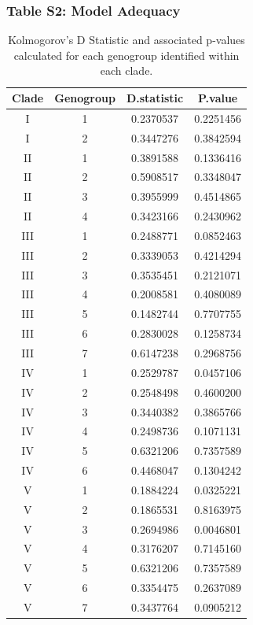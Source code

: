 \documentclass[
  11pt,
]{article}
\begin{document}
\hypertarget{table-s2-model-adequacy}{%
\subsubsection{Table S2: Model Adequacy}\label{table-s2-model-adequacy}}

\begin{table}[H]

\caption{\label{tab:ModelAdequacyTable}Kolmogorov's D Statistic and associated p-values calculated for each genogroup identified within each clade.}
\centering
\begin{tabular}[t]{cccc}
\toprule
Clade & Genogroup & D.statistic & P.value\\
\midrule
I & 1 & 0.2370537 & 0.2251456\\
I & 2 & 0.3447276 & 0.3842594\\
II & 1 & 0.3891588 & 0.1336416\\
II & 2 & 0.5908517 & 0.3348047\\
II & 3 & 0.3955999 & 0.4514865\\
II & 4 & 0.3423166 & 0.2430962\\
III & 1 & 0.2488771 & 0.0852463\\
III & 2 & 0.3339053 & 0.4214294\\
III & 3 & 0.3535451 & 0.2121071\\
III & 4 & 0.2008581 & 0.4080089\\
III & 5 & 0.1482744 & 0.7707755\\
III & 6 & 0.2830028 & 0.1258734\\
III & 7 & 0.6147238 & 0.2968756\\
IV & 1 & 0.2529787 & 0.0457106\\
IV & 2 & 0.2548498 & 0.4600200\\
IV & 3 & 0.3440382 & 0.3865766\\
IV & 4 & 0.2498736 & 0.1071131\\
IV & 5 & 0.6321206 & 0.7357589\\
IV & 6 & 0.4468047 & 0.1304242\\
V & 1 & 0.1884224 & 0.0325221\\
V & 2 & 0.1865531 & 0.8163975\\
V & 3 & 0.2694986 & 0.0046801\\
V & 4 & 0.3176207 & 0.7145160\\
V & 5 & 0.6321206 & 0.7357589\\
V & 6 & 0.3354475 & 0.2637089\\
V & 7 & 0.3437764 & 0.0905212\\

\end{tabular}
\end{table}
\end{document}
